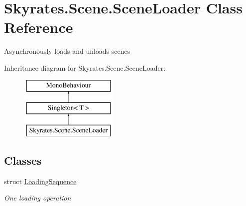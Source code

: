\hypertarget{class_skyrates_1_1_scene_1_1_scene_loader}{\section{Skyrates.\-Scene.\-Scene\-Loader Class Reference}
\label{class_skyrates_1_1_scene_1_1_scene_loader}
}


Asynchronously loads and unloads scenes  


Inheritance diagram for Skyrates.\-Scene.\-Scene\-Loader\-:\begin{figure}[H]
\begin{center}
\leavevmode
\includegraphics[height=3.000000cm]{class_skyrates_1_1_scene_1_1_scene_loader}
\end{center}
\end{figure}
\subsection*{Classes}
\begin{DoxyCompactItemize}
\item 
struct \hyperlink{struct_skyrates_1_1_scene_1_1_scene_loader_1_1_loading_sequence}{Loading\-Sequence}
\begin{DoxyCompactList}\small\item\em One loading operation \end{DoxyCompactList}\end{DoxyCompactItemize}
